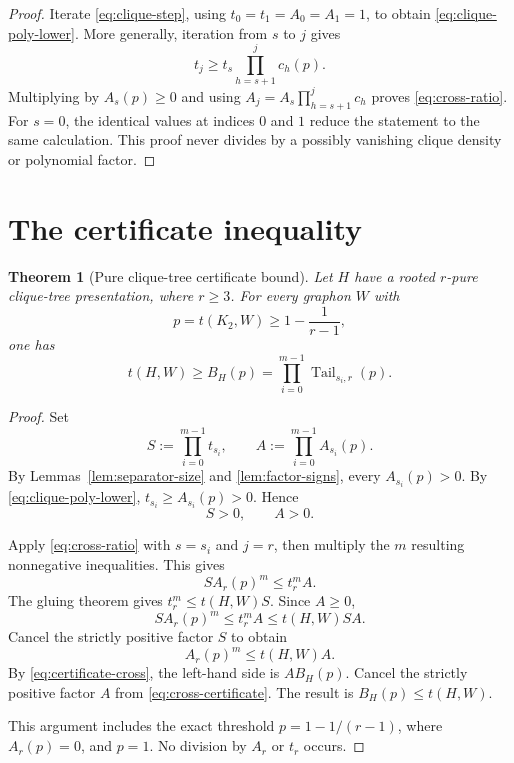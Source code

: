\documentclass[11pt]{article}
\newtheorem{theorem}{Theorem}
\newcommand{\Tail}{\operatorname{Tail}}
\begin{document}
\begin{proof}
Iterate \eqref{eq:clique-step}, using \(t_0=t_1=A_0=A_1=1\), to obtain
\eqref{eq:clique-poly-lower}.  More generally, iteration from \(s\) to \(j\)
gives
\[
    t_j
    \ge
    t_s\prod_{h=s+1}^{j}c_h(p).
\]
Multiplying by \(A_s(p)\ge0\) and using
\(A_j=A_s\prod_{h=s+1}^{j}c_h\) proves
\eqref{eq:cross-ratio}.  For \(s=0\), the identical values at indices \(0\)
and \(1\) reduce the statement to the same calculation.  This proof never
divides by a possibly vanishing clique density or polynomial factor.
\end{proof}

\section{The certificate inequality}

\begin{theorem}[Pure clique-tree certificate bound]\label{thm:certificate}
Let \(H\) have a rooted \(r\)-pure clique-tree presentation, where \(r\ge3\).
For every graphon \(W\) with
\[
    p=t(K_2,W)\ge1-\frac1{r-1},
\]
one has
\begin{equation}\label{eq:certificate-bound}
    t(H,W)\ge B_H(p)
    =\prod_{i=0}^{m-1}\Tail_{s_i,r}(p).
\end{equation}
\end{theorem}

\begin{proof}
Set
\[
    S:=\prod_{i=0}^{m-1}t_{s_i},
    \qquad
    A:=\prod_{i=0}^{m-1}A_{s_i}(p).
\]
By Lemmas~\ref{lem:separator-size} and \ref{lem:factor-signs}, every
\(A_{s_i}(p)>0\).  By \eqref{eq:clique-poly-lower},
\(t_{s_i}\ge A_{s_i}(p)>0\).  Hence
\begin{equation}\label{eq:SA-positive}
    S>0,
    \qquad A>0.
\end{equation}

Apply \eqref{eq:cross-ratio} with \(s=s_i\) and \(j=r\), then multiply the
\(m\) resulting nonnegative inequalities.  This gives
\begin{equation}\label{eq:ratio-product}
    S A_r(p)^m
    \le
    t_r^m A.
\end{equation}
The gluing theorem gives \(t_r^m\le t(H,W)S\).  Since \(A\ge0\),
\[
    S A_r(p)^m
    \le
    t_r^mA
    \le
    t(H,W)SA.
\]
Cancel the strictly positive factor \(S\) to obtain
\begin{equation}\label{eq:cross-certificate}
    A_r(p)^m\le t(H,W)A.
\end{equation}
By \eqref{eq:certificate-cross}, the left-hand side is \(AB_H(p)\).
Cancel the strictly positive factor \(A\) from
\eqref{eq:cross-certificate}.  The result is
\(B_H(p)\le t(H,W)\).

This argument includes the exact threshold
\(p=1-1/(r-1)\), where \(A_r(p)=0\), and \(p=1\).  No division by \(A_r\)
or \(t_r\) occurs.
\end{proof}
\end{document}
